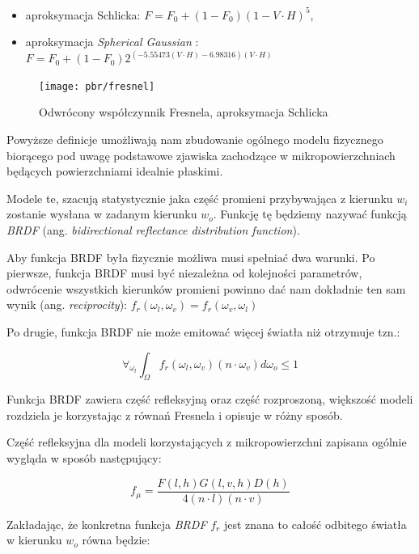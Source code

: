 \documentclass[../main.tex]{subfiles}
\begin{document}
\begin{itemize}
\item aproksymacja Schlicka: $F = F_0 + (1 - F_0)(1-V \cdot H)^5$,
\item aproksymacja \textit{Spherical Gaussian} \cite{SphericalGaussianLegarde}:
	$ F = F_0 +(1−F_0) 2^{
		\left(−5.55473\left(V \cdot H\right)−6.98316\right) (V \cdot H)
	} $
\end{itemize}

\begin{figure}[ht]
	\centering
  \texttt{[image: pbr/fresnel]}
	\caption{Odwrócony współczynnik Fresnela, aproksymacja Schlicka}
\end{figure}

Powyższe definicje umożliwają nam zbudowanie ogólnego modelu fizycznego
biorącego pod uwagę podstawowe zjawiska zachodzące w mikropowierzchniach
będących powierzchniami idealnie płaskimi.

Modele te, szacują statystycznie jaka część promieni przybywająca z kierunku
$w_i$ zostanie wysłana w zadanym kierunku $w_o$. Funkcję tę będziemy nazywać
funkcją \textit{BRDF} (ang. \textit{bidirectional reflectance distribution
function}).

Aby funkcja BRDF była fizycznie możliwa musi spełniać dwa warunki. Po pierwsze,
funkcja BRDF musi być niezależna od kolejności parametrów, odwrócenie
wszystkich kierunków promieni powinno dać nam dokładnie ten sam wynik (ang.
\textit{reciprocity}):
	$f_r(\omega_l, \omega_v) = f_r(\omega_v, \omega_l)$

Po drugie, funkcja BRDF nie może emitować więcej światła niż otrzymuje tzn.:

$$
\forall_{\omega_l} \int_{\Omega} {
    f_r(\omega_l, \omega_v)
    (n \cdot \omega_v) d\omega_o \leq 1
}
$$

Funkcja BRDF zawiera część refleksyjną oraz część rozproszoną, większość modeli
rozdziela je korzystając z równań Fresnela i opisuje w różny sposób.

Część refleksyjna dla modeli korzystających z mikropowierzchni zapisana ogólnie
wygląda w sposób następujący:

\begin{displaymath}
  f_{\mu} = \frac{
    F(l,h) G(l,v,h) D(h)
  }{
    4 (n \cdot l) (n \cdot v)
  }
\end{displaymath}

Zakładając, że konkretna funkcja \textit{BRDF} $f_r$ jest znana to całość
odbitego światła w kierunku $w_o$ równa będzie:
\end{document}
